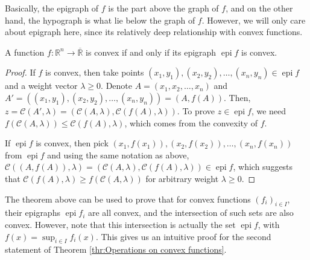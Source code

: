 Basically, the epigraph of \( f \) is the part above the graph of \( f \), and
on the other hand, the hypograph is what lie below the graph of \( f \).
However, we will only care about epigraph here, since its relatively deep
relationship with convex functions.

\begin{theorem}
\label{thr:Convex functions and convex epigraphs}
  A function \( f: \mathbb{R}^{n} \to  \overline{\mathbb{R}}  \) is convex if
  and only if its epigraph \( \operatorname{epi} f \) is convex.
\end{theorem}

\begin{proof}
  If \( f \) is convex, then take points \( (x_{1}, y_{1}), (x_{2}, y_{2}),
  \ldots , (x_{n}, y_{n}) \in \operatorname{epi} f \) and a weight vector \(
  \lambda \ge 0 \). Denote \( A = (x_{1}, x_{2}, \ldots , x_{n})   \) and \( A'
  = ((x_{1},y_{1}), (x_{2}, y_{2}), \ldots , (x_{n},y_{n})) = (A, f(A))\).
  Then, \( z = \mathcal{C}(A', \lambda) = (\mathcal{C}(A, \lambda),
  \mathcal{C}(f(A), \lambda)) \). To prove \( z \in \operatorname{epi} f \), we
  need \( f(\mathcal{C}(A, \lambda)) \le \mathcal{C}(f(A), \lambda) \), which
  comes from the convexity of \( f \).

  If \( \operatorname{epi} f \) is convex, then pick \( (x_{1}, f(x_{1})),
  (x_{2}, f(x_{2})), \ldots ,(x_{n}, f(x_{n})) \) from \( \operatorname{epi} f
  \) and using the same notation as above, \( \mathcal{C}((A, f(A)), \lambda) =
  (\mathcal{C}(A, \lambda), \mathcal{C}(f(A), \lambda)) \in \operatorname{epi}f
  \), which suggests that \( \mathcal{C}(f(A), \lambda) \ge f(\mathcal{C}(A,
  \lambda)) \) for arbitrary weight \( \lambda \ge 0 \).
\end{proof}

The theorem above can be used to prove that for convex functions \( (f_{i})_{i
\in I} \), their epigraphs \( \operatorname{epi} f_{i} \) are all convex, and
the intersection of such sets are also convex. However, note that this
intersection is actually the set \( \operatorname{epi} f \), with \( f(x) =
\sup_{i \in I} f_{i}(x) \). This gives us an intuitive proof for the second
statement of Theorem \ref{thr:Operations on convex functions}.


